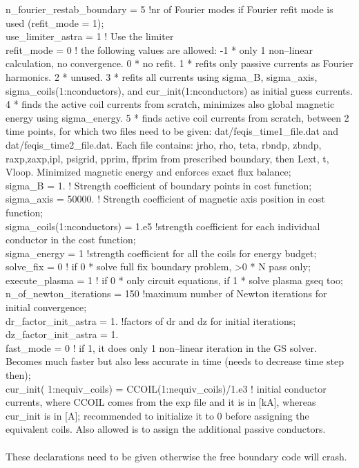 \documentclass[12pt]{article}
\begin{document}
n\_fourier\_restab\_boundary = 5 !nr of Fourier modes if Fourier refit mode is used (refit\_mode = 1);\\
use\_limiter\_astra = 1   ! Use the limiter \\
refit\_mode = 0   ! the following values are allowed: -1 * only 1 non--linear calculation, no convergence. 0 * no refit. 1 * refits only passive currents as Fourier harmonics. 2 * unused. 3 * refits all currents using sigma\_B, sigma\_axis, sigma\_coils(1:nconductors), and cur\_init(1:nconductors) as initial guess currents. 4 * finds the active coil currents from scratch, minimizes also global magnetic energy using sigma\_energy. 5 * finds active coil currents from scratch, between 2 time points, for which two files need to be given: dat/feqis\_time1\_file.dat and dat/feqis\_time2\_file.dat. Each file contains: jrho, rho, teta, rbndp, zbndp, raxp,zaxp,ipl, psigrid, pprim, ffprim from prescribed boundary, then Lext, t, Vloop. Minimized magnetic energy and enforces exact flux balance;\\
sigma\_B = 1. ! Strength coefficient of boundary points in cost function;\\
sigma\_axis = 50000. ! Strength coefficient of magnetic axis position in cost function;\\
sigma\_coils(1:nconductors) = 1.e5 !strength coefficient for each individual conductor in the cost function;\\
sigma\_energy = 1 !strength coefficient for all the coils for energy budget;\\
solve\_fix = 0   ! if 0 * solve full fix boundary problem, >0 * N pass only;  \\
execute\_plasma = 1   ! if 0 * only circuit equations, if 1 * solve plasma gseq too; \\
n\_of\_newton\_iterations = 150 !maximum number of Newton iterations for initial convergence;\\
dr\_factor\_init\_astra = 1. !factors of dr and dz for initial iterations; \\
dz\_factor\_init\_astra = 1. \\
fast\_mode = 0 ! if 1, it does only 1 non--linear iteration in the GS solver. Becomes much faster but also less accurate in time (needs to decrease time step then);\\
cur\_init( 1:nequiv\_coils) = CCOIL(1:nequiv\_coils)/1.e3 ! initial conductor currents, where CCOIL comes from the exp file and it is in [kA], whereas cur\_init is in [A]; recommended to initialize it to 0 before assigning the equivalent coils. Also allowed is to assign the additional passive conductors. \\\\
These declarations need to be given otherwise the free boundary code will crash.
\end{document}
